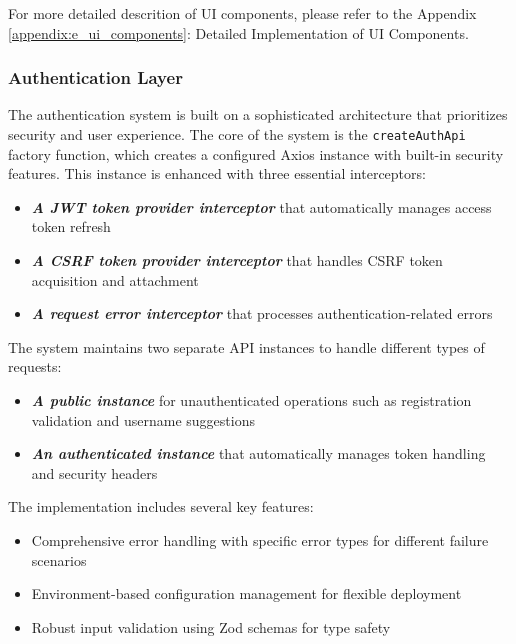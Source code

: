 \documentclass[../Main.tex]{subfiles}
\begin{document}
{{	For more detailed descrition of UI components, please refer to the Appendix
	\ref{appendix:e_ui_components}: Detailed Implementation of UI Components.

	\subsubsection{Authentication Layer}
	\label{section:4.3.2.2_authentication_layer}

	The authentication system is built on a sophisticated architecture that
	prioritizes security and user experience. The core of the system is the \texttt{createAuthApi}
	factory function, which creates a configured Axios instance with built-in security
	features. This instance is enhanced with three essential interceptors:

	\begin{itemize}
		\item \emph{\textbf{A JWT token provider interceptor}} that automatically
			manages access token refresh

		\item \emph{\textbf{A CSRF token provider interceptor}} that handles CSRF
			token acquisition and attachment

		\item \emph{\textbf{A request error interceptor}} that processes
			authentication-related errors
	\end{itemize}

	The system maintains two separate API instances to handle different types of requests:
	\begin{itemize}
		\item \emph{\textbf{A public instance}} for unauthenticated operations such
			as registration validation and username suggestions

		\item \emph{\textbf{An authenticated instance}} that automatically manages
			token handling and security headers
	\end{itemize}

	The implementation includes several key features:
	\begin{itemize}
		\item Comprehensive error handling with specific error types for different failure
			scenarios

		\item Environment-based configuration management for flexible deployment

		\item Robust input validation using Zod schemas for type safety


\end{itemize}}}
\end{document}
